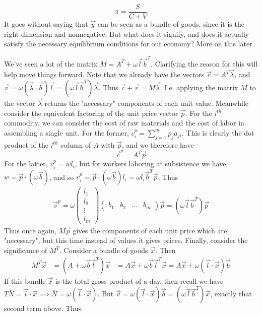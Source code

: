\documentclass{article}
\theoremstyle{definition}
\theoremstyle{plain}
\theoremstyle{theorem}
\begin{document}
\[ \pi = \frac{S}{C+V} \]
It goes without saying that $\vec{y}$ can be seen as a bundle of goods, since it is the right dimension and nonnegative. But what does it signify, and does it actually satisfy the necessary equilibrium conditions for our economy? More on this later. \par 
We've seen a lot of the matrix $M = A^T + \omega\vec{l}\vec{b}^T$. Clarifying the reason for this will help move things forward. Note that we already have the vectors $\vec{c} = A^T\vec{\lambda}$, and $\vec{v} = \omega(\vec{\lambda} \cdot \vec{b})\vec{l} = (\omega\vec{l}\vec{b}^T)\vec{\lambda}$. Thus $\vec{c} + \vec{v} = M\vec{\lambda}$. I.e. applying the matrix $M$ to the vector $\vec{\lambda}$ returns the "necessary" components of each unit value. Meanwhile consider the equivalent factoring of the unit price vector $\vec{p}$. For the $i^{th}$ commodity, we can consider the cost of raw materials and the cost of labor in assembling a single unit. For the former, $c^p_i = \sum_{j=1}^m p_ja_{ji}$. This is clearly the dot product of the $i^{th}$ column of $A$ with $\vec{p}$, and we therefore have 
\[ \vec{c}^p = A^T\vec{p} \] 
For the latter, $v^p_i = wl_i$, but for workers laboring at subsistence we have $w = \vec{p}\cdot (\omega\vec{b})$, and so $v^p_i = \vec{p}\cdot (\omega\vec{b})l_i = \omega l_i \vec{b}^T\vec{p}$. Thus 
\begin{align*}
	\vec{v}^p = \omega\begin{pmatrix} l_1 \\ l_2 \\ \vdots \\ l_m \end{pmatrix} \begin{pmatrix} b_1 & b_2 & \ldots & b_m \end{pmatrix}\vec{p} = (\omega\vec{l}\vec{b}^T)\vec{p}
\end{align*}
Thus once again, $M\vec{p}$ gives the components of each unit price which are "necessary", but this time instead of values it gives prices. Finally, consider the significance of $M^T$. Consider a bundle of goods $\vec{x}$. Then
\begin{align*}
	 M^T\vec{x} &= (A + \omega\vec{b}\vec{l}^T)\vec{x}
	 	&= A\vec{x} + \omega\vec{b}\vec{l}^T\vec{x} = A\vec{x} + \omega(\vec{l}\cdot \vec{x})\vec{b}
\end{align*} 
If this bundle $\vec{x}$ is the total gross product of a day, then recall we have $T\bar{N} = \vec{l}\cdot\vec{x} \implies  \bar{N} = \omega(\vec{l}\cdot\vec{x})$. But $\vec{v} = \omega(\vec{l}\cdot\vec{x})\vec{b} = (\omega\vec{l}\vec{b}^T)\vec{x}$, exactly that second term above. Thus 
\end{document}
